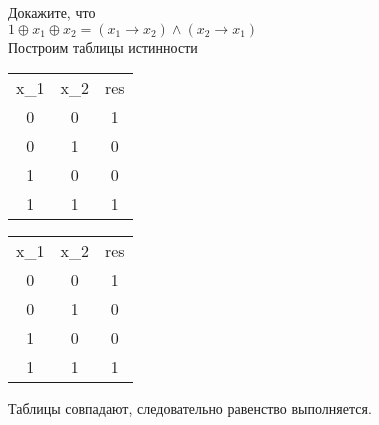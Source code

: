 \documentclass{article}
\begin{document}
\section{}
Докажите, что\\
\begin{math}
1 \oplus x_1 \oplus x_2 = (x_1 \rightarrow x_2) \wedge (x_2 \rightarrow x_1)
\end{math}
\\Построим таблицы истинности
\begin{center}
\begin{tabular}{ |c|c|c| } 
 \hline
 x_1 & x_2 & res \\
 0 & 0 & 1 \\ 
 0 & 1 & 0 \\ 
 1 & 0 & 0 \\ 
 1 & 1 & 1 \\ 
 \hline
\end{tabular}
\begin{tabular}{ |c|c|c| } 
 \hline
 x_1 & x_2 & res \\
 0 & 0 & 1 \\
 0 & 1 & 0 \\ 
 1 & 0 & 0 \\ 
 1 & 1 & 1 \\ 
 \hline
\end{tabular}
\end{center}
Таблицы совпадают, следовательно равенство выполняется.
\end{document}
